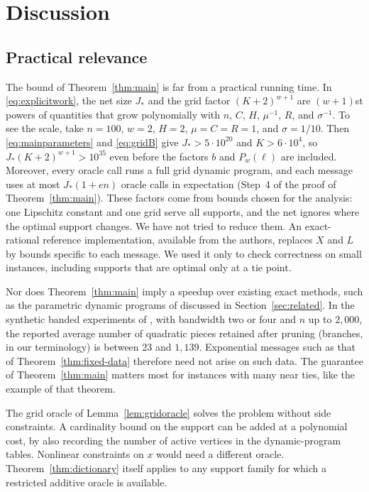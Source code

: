 \section{Discussion}\label{sec:discussion}

\subsection{Practical relevance}
The bound of Theorem~\ref{thm:main} is far from a practical running
time. In \eqref{eq:explicitwork}, the net size $J_*$ and the grid factor
$(K+2)^{w+1}$ are $(w+1)$st powers of quantities that grow polynomially
with $n$, $C$, $H$, $\mu^{-1}$, $R$, and $\sigma^{-1}$. To see the
scale, take $n=100$, $w=2$, $H=2$, $\mu=C=R=1$, and $\sigma=1/10$. Then
\eqref{eq:mainparameters} and \eqref{eq:gridB} give $J_*>5\cdot10^{20}$
and $K>6\cdot10^4$, so $J_*(K+2)^{w+1}>10^{35}$ even before the factors
$b$ and $P_w(\ell)$ are included. Moreover, every oracle call runs a
full grid dynamic program, and each message uses at most $J_*(1+en)$
oracle calls in expectation (Step~4 of the proof of
Theorem~\ref{thm:main}). These factors come from bounds chosen for the
analysis: one Lipschitz constant and one grid serve all supports, and the
net ignores where the optimal support changes. We have not tried to
reduce them. An exact-rational reference implementation, available from
the authors, replaces $X$ and $L$ by bounds specific to each message. We
used it only to check correctness on small instances, including supports
that are optimal only at a tie point.

Nor does Theorem~\ref{thm:main} imply a speedup over existing exact
methods, such as the parametric dynamic programs of
\cite{BhathenaTrees,BhathenaStructured} discussed in
Section~\ref{sec:related}. In the synthetic banded experiments of
\cite[Section~7.2, Table~1]{BhathenaStructured}, with bandwidth two or
four and $n$ up to $2{,}000$, the reported average number of quadratic
pieces retained after pruning (branches, in our terminology) is between
23 and $1{,}139$. Exponential messages such as that of
Theorem~\ref{thm:fixed-data} therefore need not arise on such data. The
guarantee of Theorem~\ref{thm:main} matters most for instances with many
near ties, like the example of that theorem.

The grid oracle of Lemma~\ref{lem:gridoracle} solves the problem
without side constraints. A cardinality bound on the support can be
added at a polynomial cost, by also recording the number of active
vertices in the dynamic-program tables. Nonlinear constraints on $x$
would need a different oracle. Theorem~\ref{thm:dictionary} itself
applies to any support family for which a restricted additive oracle is
available.

